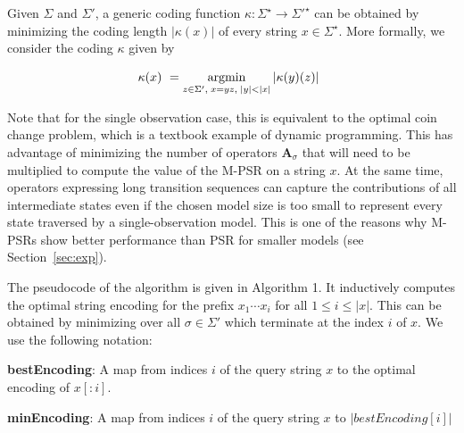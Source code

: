 \documentclass[letterpaper]{article}
\newcommand{\mat}[1]{\mathbf{#1}}
\newcommand{\A}{\mat{A}}
\newcommand{\sstar}{\Sigma^\star}
\DeclareMathOperator*{\argmin}{\rm argmin}
\begin{document}
Given $\Sigma$ and $\Sigma'$, a generic coding function $\kappa : \sstar \to {\Sigma'}^\star$ can be obtained by minimizing the coding length $|\kappa(x)|$ of every string $x \in \sstar$. More formally, we consider the coding $\kappa$ given by

\begin{equation*}
\kappa(x) ~= \argmin_{ z \in \Sigma', \; x=yz, \; |y|<|x|} |\kappa(y)(z)| \enspace 
\end{equation*}

Note that for the single observation case, this is equivalent to the optimal coin change problem, which is a textbook example of dynamic programming. This has advantage of minimizing the number of operators $\A_\sigma$ that will need to be multiplied to compute the value of the M-PSR on a string $x$. At the same time, operators expressing long transition sequences can capture the contributions of all intermediate states even if the chosen model size is too small to represent every state traversed by a single-observation model. This is one of the reasons why M-PSRs show better performance than PSR for smaller models (see Section~\ref{sec:exp}).




%

The pseudocode of the algorithm is given in Algorithm 1. It inductively computes the optimal string encoding for the prefix $x_1 \cdots x_i$ for all $1 \leq i \leq |x|$. This can be obtained by minimizing over all $\sigma \in \Sigma'$ which terminate at the index $i$ of $x$.
We use the following notation:

\textbf{bestEncoding}: A map from indices $i$ of the query string $x$ to the optimal encoding of $x[:i]$.

\textbf{minEncoding}: A map from indices $i$ of the query string $x$ to $|bestEncoding[i]|$
\end{document}
